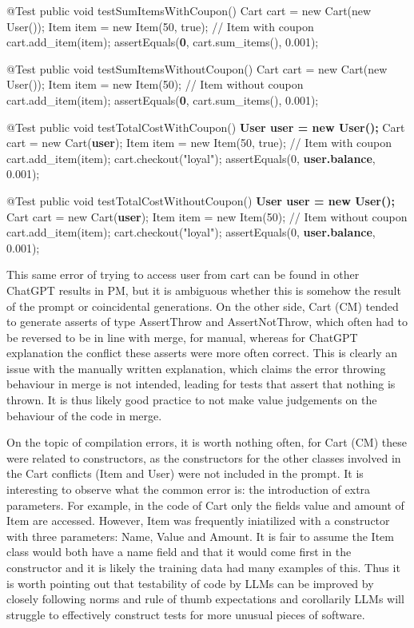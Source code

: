\begin{response}
@Test
public void testSumItemsWithCoupon() {
    Cart cart = new Cart(new User());
    Item item = new Item(50, true); // Item with coupon
    cart.add_item(item);
    assertEquals(\textbf{0}, cart.sum_items(), 0.001);
}

@Test
public void testSumItemsWithoutCoupon() {
    Cart cart = new Cart(new User());
    Item item = new Item(50); // Item without coupon
    cart.add_item(item);
    assertEquals(\textbf{0}, cart.sum_items(), 0.001);
}

@Test
public void testTotalCostWithCoupon() {
    \textbf{User user = new User();}
    Cart cart = new Cart(\textbf{user});
    Item item = new Item(50, true); // Item with coupon
    cart.add_item(item);
    cart.checkout("loyal");
    assertEquals(0, \textbf{user.balance}, 0.001);
}

@Test
public void testTotalCostWithoutCoupon() {
    \textbf{User user = new User();}
    Cart cart = new Cart(\textbf{user});
    Item item = new Item(50); // Item without coupon
    cart.add_item(item);
    cart.checkout("loyal");
    assertEquals(0, \textbf{user.balance}, 0.001);
}
\end{response}
This same error of trying to access user from cart can be found in other ChatGPT results in PM, but it is ambiguous
whether this is somehow the result of the prompt or coincidental generations. On the other side, Cart (CM) tended to generate
asserts of type AssertThrow and AssertNotThrow, which often had to be reversed to be in line with merge, for manual, whereas for
ChatGPT explanation the conflict these asserts were more often correct. This is clearly an issue with the manually written explanation,
which claims the error throwing behaviour in merge is not intended, leading for tests that assert that nothing is thrown.
It is thus likely good practice to not make value judgements on the behaviour of the code in merge.

On the topic of compilation errors, it is worth nothing often, for Cart (CM) these were related to constructors, as the constructors
for the other classes involved in the Cart conflicts (Item and User) were not included in the prompt. It is interesting
to observe what the common error is: the introduction of extra parameters. For example, in the code of Cart only the fields
value and amount of Item are accessed. However, Item was frequently iniatilized with a constructor with three parameters: Name,
Value and Amount. It is fair to assume the Item class would both have a name field and that it would come first in the constructor
and it is likely the training data had many examples of this. Thus it is worth pointing out that testability of code by LLMs can be
improved by closely following norms and rule of thumb expectations and corollarily LLMs will struggle to effectively construct tests
for more unusual pieces of software.

